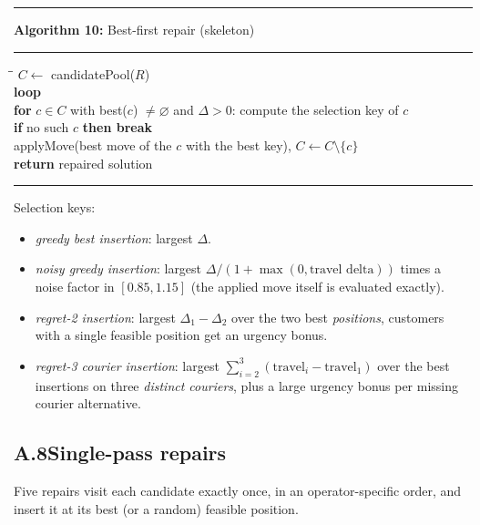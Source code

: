 \documentclass[10pt, a4paper]{article}
\begin{document}
\begin{center}
\begin{minipage}{0.92\linewidth}
\small
\hrule\vspace{2pt}
\textbf{Algorithm 10:} Best-first repair (skeleton)
\vspace{2pt}\hrule\vspace{4pt}
\begin{tabbing}
\hspace{1.2em}\=\hspace{1.2em}\=\kill
$C \leftarrow$ candidatePool($R$)\\
\textbf{loop}\\
\>\textbf{for} $c \in C$ with best($c$) $\neq \varnothing$ and
  $\Delta > 0$: compute the selection key of $c$\\
\>\textbf{if} no such $c$ \textbf{then break}\\
\>applyMove(best move of the $c$ with the best key),\quad
  $C \leftarrow C \setminus \{c\}$\\
\textbf{return} repaired solution
\end{tabbing}
\vspace{2pt}\hrule
\end{minipage}
\end{center}

\noindent Selection keys:
\begin{itemize}\itemsep1pt
\item \emph{greedy best insertion}: largest $\Delta$.
\item \emph{noisy greedy insertion}: largest $\Delta / (1 +
  \max(0, \text{travel delta}))$ times a noise factor in $[0.85, 1.15]$
  (the applied move itself is evaluated exactly).
\item \emph{regret-2 insertion}: largest $\Delta_1 - \Delta_2$ over the
  two best \emph{positions}, customers with a single feasible position
  get an urgency bonus.
\item \emph{regret-3 courier insertion}: largest
  $\sum_{i=2}^{3}(\text{travel}_i - \text{travel}_1)$ over the best
  insertions on three \emph{distinct couriers}, plus a large urgency bonus
  per missing courier alternative.
\end{itemize}

\subsection*{A.8\quad Single-pass repairs}

Five repairs visit each candidate exactly once, in an operator-specific
order, and insert it at its best (or a random) feasible position.
\end{document}
